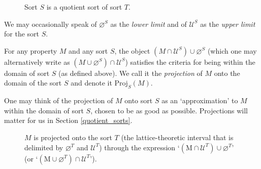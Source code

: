 \documentclass[12pt]{book}
\begin{document}
\begin{figure}[htbp]
\centering
{}
\caption{Sort $S$ is a quotient sort of sort $T$.}
\label{fig:diamonds}
\end{figure}


We may occasionally speak of $\varnothing^S$ as the \textit{lower limit} and of $\mathcal{U}^S$ as the \textit{upper limit} for the sort $S$.

For any property $M$ and any sort $S$, the object $(M \cap \mathcal{U}^S) \cup \varnothing^S$ (which one may alternatively write as $(M \cup \varnothing^S) \cap \mathcal{U}^S$) satisfies the criteria for being within the domain of sort $S$ (as defined above). We call it the \textit{projection} of $M$ onto the domain of the sort $S$ and denote it $\mathrm{Proj}_S(M)$.

One may think of the projection of $M$ onto sort $S$ as an `approximation' to $M$ within the domain of sort $S$, chosen to be as good as possible. Projections will matter for us in Section \ref{quotient_sorts}.

\begin{figure}[htbp]
\centering
{}
\caption{$M$ is projected onto the sort $T$ (the lattice-theoretic interval that is delimited by $\varnothing^T$ and $\mathcal{U}^T$) through the expression `$(\mathrm{M} \cap \mathcal{U}^T) \cup \varnothing^T$' (or `$(\mathrm{M} \cup \varnothing^T) \cap \mathcal{U}^T$'). }
\label{fig:diamonds}
\end{figure}
\end{document}
